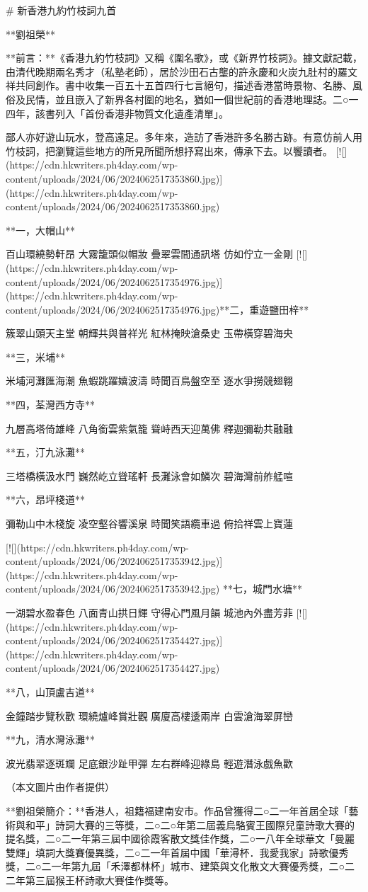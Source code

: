 # 新香港九約竹枝詞九首



**劉祖榮**

**前言：**《香港九約竹枝詞》又稱《圍名歌》，或《新界竹枝詞》。據文獻記載，由清代晚期兩名秀才（私塾老師），居於沙田石古壟的許永慶和火炭九肚村的羅文祥共同創作。書中收集一百五十五首四行七言絕句，描述香港當時景物、名勝、風俗及民情，並且嵌入了新界各村圍的地名，猶如一個世紀前的香港地理誌。二○一四年，該書列入「首份香港非物質文化遺產清單」。

鄙人亦好遊山玩水，登高遠足。多年來，造訪了香港許多名勝古跡。有意仿前人用竹枝詞，把瀏覽這些地方的所見所聞所想抒寫出來，傳承下去。以饗讀者。  
[![](https://cdn.hkwriters.ph4day.com/wp-content/uploads/2024/06/2024062517353860.jpg)](https://cdn.hkwriters.ph4day.com/wp-content/uploads/2024/06/2024062517353860.jpg)

**一，大帽山**

百山環繞勢軒昂  
大霧籠頭似帽妝  
疊翠雲間通訊塔  
仿如佇立一金剛  
[![](https://cdn.hkwriters.ph4day.com/wp-content/uploads/2024/06/2024062517354976.jpg)](https://cdn.hkwriters.ph4day.com/wp-content/uploads/2024/06/2024062517354976.jpg)**二，重遊鹽田梓**

簇翠山頭天主堂  
朝輝共與普祥光  
紅林掩映滄桑史  
玉帶橫穿碧海央

**三，米埔**

米埔河灘匯海潮  
魚蝦跳躍嬉波濤  
時聞百鳥盤空至  
逐水爭撈競翅翺

**四，荃灣西方寺**

九層高塔倚雄峰  
八角銜雲紫氣籠  
聳峙西天迎萬佛  
釋迦彌勒共融融

**五，汀九泳灘**

三塔橋橫汲水門  
巍然屹立聳瑤軒  
長灘泳會如鱗次  
碧海灣前舴艋喧

**六，昂坪棧道**

彌勒山中木棧旋  
凌空壑谷響溪泉  
時聞笑語纜車過  
俯拾祥雲上寶蓮

[![](https://cdn.hkwriters.ph4day.com/wp-content/uploads/2024/06/2024062517353942.jpg)](https://cdn.hkwriters.ph4day.com/wp-content/uploads/2024/06/2024062517353942.jpg)  
**七，城門水塘**

一湖碧水盈春色  
八面青山拱日輝  
守得心門風月韻  
城池內外盡芳菲  
[![](https://cdn.hkwriters.ph4day.com/wp-content/uploads/2024/06/2024062517354427.jpg)](https://cdn.hkwriters.ph4day.com/wp-content/uploads/2024/06/2024062517354427.jpg)

**八，山頂盧吉道**

金鐘踏步覽秋歡  
環繞爐峰賞壯觀  
廣廈高樓逶兩岸  
白雲滄海翠屏巒

**九，清水灣泳灘**

波光翡翠逐斑斕  
足底銀沙趾甲彈  
左右群峰迎綠島  
輕遊潛泳戲魚歡

（本文圖片由作者提供）

**劉祖榮簡介：**香港人，祖籍福建南安市。作品曾獲得二○二一年首屆全球「藝術與和平」詩詞大賽的三等獎，二○二○年第二屆義烏駱賓王國際兒童詩歌大賽的提名獎，二○二一年第三屆中國徐霞客散文獎佳作獎，二○一八年全球華文「曼麗雙輝」填詞大獎賽優異獎，二○二一年首屆中國「華潯杯．我愛我家」詩歌優秀獎，二○二一年第九屆「禾澤都林杯」城市、建築與文化散文大賽優秀獎，二○二二年第三屆猴王杯詩歌大賽佳作獎等。